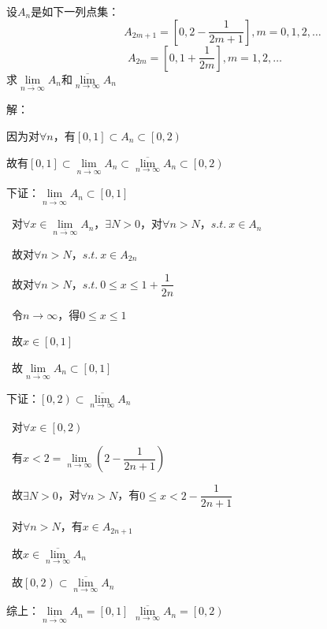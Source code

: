 \begin{eg}
设$A_{n}$是如下一列点集：
\[ \quad \quad \quad \ A_{2m + 1} = \left[0,2 -\dfrac{1}{2m+1}\right],m=0,1,2,\dots\]
\[A_{2m} = \left[0,1 + \dfrac{1}{2m}\right],m=1,2,\dots\]
求$\lim \limits_{\overline{n \to \infty}}A_{n}$和$\overline{\lim \limits_{n \to \infty}}A_{n}$    
\end{eg}
\noindent 解：
\par 因为对$\forall n$，有$\left[0,1\right] \subset A_{n} \subset \left[0,2\right) $
\par 故有$\left[0,1\right] \subset \lim \limits_{\overline{n \to \infty}}A_{n} \subset \overline{\lim \limits_{n \to \infty}}A_{n}\subset \left[0,2\right) $
\par {} 下证：$\lim \limits_{\overline{n \to \infty}}A_{n} \subset \left[0,1\right]$
\par \quad \ 对$\forall x \in \lim \limits_{\overline{n \to \infty}}A_{n}$，$\exists N > 0$，对$\forall n > N$，$s.t. \ x \in A_{n}$
\par \quad \ 故对$\forall n > N$，$s.t. \ x \in A_{2n}$
\par \quad \ 故对$\forall n > N$，$s.t. \ 0 \leqslant  x \leqslant 1 + \dfrac{1}{2n}$
\par \quad \ 令$n \to \infty$，得$0 \leqslant x \leqslant 1$
\par \quad \ 故$x \in \left[0,1\right] $
\par \quad \ 故$\lim \limits_{\overline{n \to \infty}}A_{n} \subset \left[0,1\right]$
\par {} 下证：$\left[0,2\right) \subset \overline{\lim \limits_{n \to \infty}}A_{n}$
\par \quad \ 对$\forall x \in \left[0,2\right) $
\par \quad \ 有$x < 2 = \lim \limits_{n \to \infty} \left( 2 -\dfrac{1}{2n+1} \right)$
\par \quad \ 故$\exists N >0$，对$\forall n > N$，有$0 \leqslant  x < 2 -\dfrac{1}{2n+1} $
\par \quad \ 对$\forall n > N$，有$x \in A_{2n + 1}$
\par \quad \ 故$x \in \overline{\lim \limits_{n \to \infty}}A_{n}$
\par \quad \ 故$\left[0,2\right) \subset \overline{\lim \limits_{n \to \infty}}A_{n}$
\par 综上：$\lim \limits_{\overline{n \to \infty}}A_{n} = \left[0,1\right]$ \quad $\overline{\lim \limits_{n \to \infty}}A_{n} = \left[0,2\right)$

